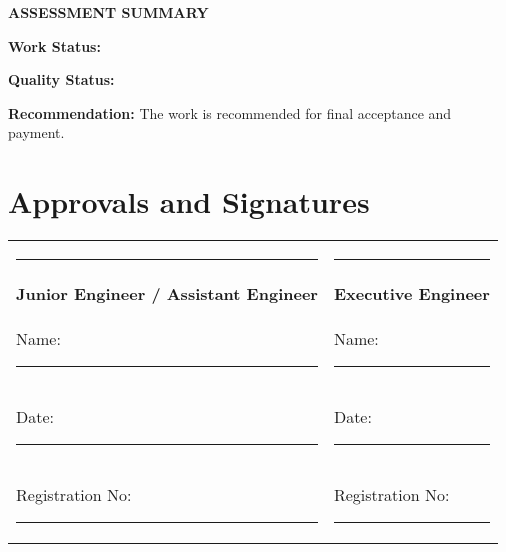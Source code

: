 \documentclass[12pt,a4paper]{article}
\begin{document}
\begin{center}
{\begin{minipage}{0.95\textwidth}
\begin{center}
\colorbox{certgold!20}{\begin{minipage}{0.8\textwidth}
\begin{center}
\textbf{\textcolor{certblue}{ASSESSMENT SUMMARY}}
\end{center}

\vspace{0.3cm}
\textbf{Work Status:} 

\textbf{Quality Status:} 

\textbf{Recommendation:} The work is recommended for final acceptance and payment.
\end{minipage}}
\end{center}

\vspace{1cm}
\end{minipage}}
\end{center}

\vspace{1.5cm}
\section*{Approvals and Signatures}

\begin{center}
\begin{tabular}{p{7cm}p{7cm}}
\rule{6cm}{0.5pt} & \rule{6cm}{0.5pt} \\
\textbf{Junior Engineer / Assistant Engineer} & \textbf{Executive Engineer} \\
Name: \rule{4cm}{0.5pt} & Name: \rule{4cm}{0.5pt} \\
Date: \rule{4cm}{0.5pt} & Date: \rule{4cm}{0.5pt} \\
Registration No: \rule{3cm}{0.5pt} & Registration No: \rule{3cm}{0.5pt} \\
\end{tabular}
\end{center}
\end{document}
